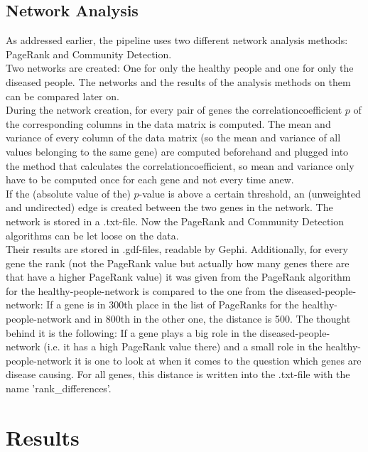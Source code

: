 \documentclass{bioinfo}
\begin{document}
\subsection{Network Analysis}
As addressed earlier, the pipeline uses two different network analysis methods: PageRank and Community Detection.\\
Two networks are created: One for only the healthy people and one for only the diseased people. The networks and the results of the analysis methods on them can be compared later on.\\
During the network creation, for every pair of genes the correlationcoefficient $p$ of the corresponding columns in the data matrix is computed. The mean and variance of every column of the data matrix (so the mean and variance of all values belonging to the same gene) are computed beforehand and plugged into the method that calculates the correlationcoefficient, so mean and variance only have to be computed once for each gene and not every time anew.\\
If the (absolute value of the) $p$-value is above a certain threshold, an (unweighted and undirected) edge is created between the two genes in the network. The network is stored in a .txt-file. Now the PageRank and Community Detection algorithms can be let loose on the data.\\
Their results are stored in .gdf-files, readable by Gephi. Additionally, for every gene the rank (not the PageRank value but actually how many genes there are that have a higher PageRank value) it was given from the PageRank algorithm for the healthy-people-network is compared to the one from the diseased-people-network: If a gene is in 300th place in the list of PageRanks for the healthy-people-network and in 800th in the other one, the distance is 500. The thought behind it is the following: If a gene plays a big role in the diseased-people-network (i.e. it has a high PageRank value there) and a small role in the healthy-people-network it is one to look at when it comes to the question which genes are disease causing. For all genes, this distance is written into the .txt-file with the name 'rank\_differences'.\\



\section{Results}
\end{document}
